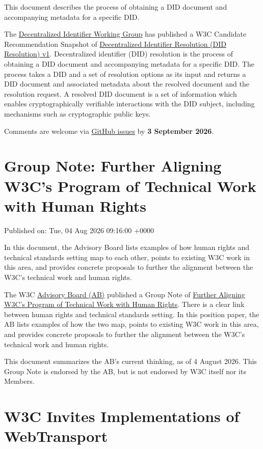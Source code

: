\documentclass[11pt,a4paper]{article}
\begin{document}
This document describes the process of obtaining a DID document and accompanying metadata for a specific DID.

The \href{https://www.w3.org/groups/wg/did}{Decentralized Identifier Working Group} has published a W3C Candidate Recommendation Snapshot of \href{https://www.w3.org/TR/2026/CR-did-resolution-1.0-20260806/}{Decentralized Identifier Resolution (DID Resolution) v1}. Decentralized identifier (DID) resolution is the process of obtaining a DID document and accompanying metadata for a specific DID. The process takes a DID and a set of resolution options as its input and returns a DID document and associated metadata about the resolved document and the resolution request. A resolved DID document is a set of information which enables cryptographically verifiable interactions with the DID subject, including mechanisms such as cryptographic public keys.

Comments are welcome via \href{https://github.com/w3c/did-resolution/issues/}{GitHub issues} by \textbf{3 September 2026}.

\section{Group Note: Further Aligning W3C's Program of Technical Work with Human Rights}

Published on: Tue, 04 Aug 2026 09:16:00 +0000

In this document, the Advisory Board lists examples of how human rights and technical standards setting map to each other, points to existing W3C work in this area, and provides concrete proposals to further the alignment between the W3C's technical work and human rights.

The W3C \href{https://www.w3.org/groups/other/ab}{Advisory Board (AB)} published a Group Note of \href{https://www.w3.org/TR/2026/NOTE-furthering-human-rights-20260804/}{Further Aligning W3C's Program of Technical Work with Human Rights}. There is a clear link between human rights and technical standards setting. In this position paper, the AB lists examples of how the two map, points to existing W3C work in this area, and provides concrete proposals to further the alignment between the W3C's technical work and human rights.

This document summarizes the AB's current thinking, as of 4 August 2026. This Group Note is endorsed by the AB, but is not endorsed by W3C itself nor its Members.

\section{W3C Invites Implementations of WebTransport}
\end{document}
